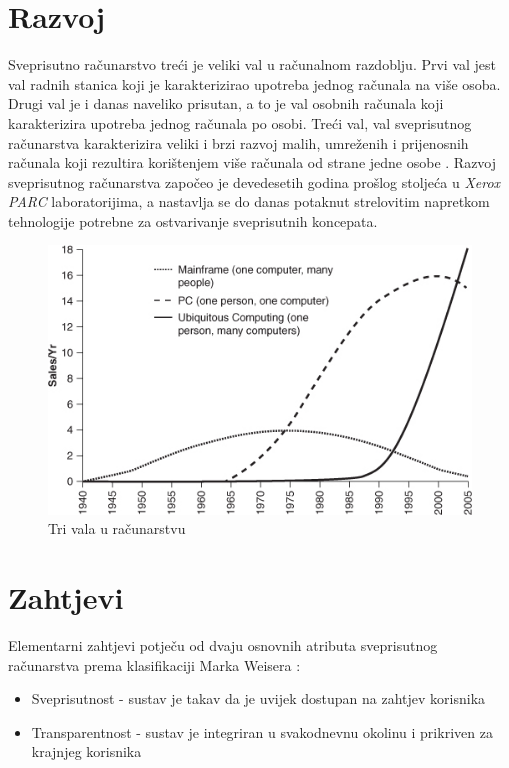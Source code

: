 \documentclass[times, utf8, diplomski, numeric]{fer}
\begin{document}
\section{Razvoj}
Sveprisutno računarstvo treći je veliki val u računalnom razdoblju. Prvi val
jest val radnih stanica  koji je karakterizirao upotreba jednog
računala na više osoba. Drugi val je i danas naveliko prisutan, a to je val
osobnih računala  koji karakterizira upotreba jednog
računala po osobi. Treći val, val sveprisutnog računarstva karakterizira veliki
i brzi razvoj malih, umreženih i prijenosnih računala koji rezultira korištenjem
više računala od strane jedne osobe \cite{Krumm2009}. Razvoj sveprisutnog
računarstva započeo je devedesetih godina prošlog stoljeća u \emph{Xerox PARC}
laboratorijima, a nastavlja se do danas potaknut strelovitim napretkom
tehnologije potrebne za ostvarivanje sveprisutnih koncepata.

\begin{figure}[H]
	\centering
	\includegraphics[width=12cm]{images/majortrends2.png}
	\caption{Tri vala u računarstvu}
	\label{fig:majortrends}
\end{figure}

\section{Zahtjevi}
Elementarni zahtjevi potječu od dvaju osnovnih atributa sveprisutnog računarstva
prema klasifikaciji Marka Weisera \cite{Weiser93}:
\begin{itemize}
  \item Sveprisutnost - sustav je takav da je uvijek dostupan na zahtjev
  korisnika
  \item Transparentnost - sustav je integriran u svakodnevnu okolinu i prikriven
  za krajnjeg korisnika
\end{itemize}
\end{document}

